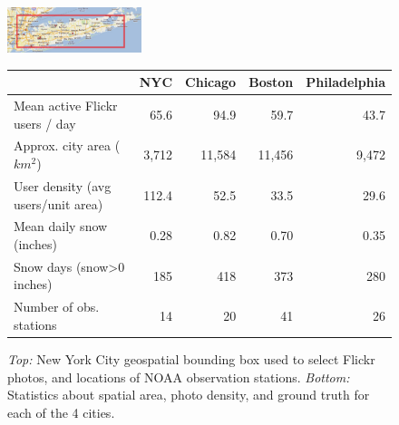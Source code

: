 

\begin{figure}
\begin{center}
\includegraphics[width=0.35\textwidth]{plots/nyc_stations.png} 
\end{center}
%
%
%
\begin{center}
{\small{
\newcommand{\spc}{\hspace{2pt}}
\begin{tabular} {|@{\spc}l@{\spc}|@{\spc}r@{\spc}|@{\spc}r@{\spc}|@{\spc}r@{\spc}|@{\spc}r@{\spc}|} 
\hline 
\textbf{} &{NYC}  &{Chicago} &{Boston}&{Philadelphia} \tabularnewline
\hline 
{Mean active Flickr users / day} &{65.6} &{94.9} &{59.7} &{43.7} \tabularnewline
\hline 
{Approx. city area ($km^2$)} &{3,712} &{11,584} &{11,456} &{9,472}  \tabularnewline
\hline 
{User density (avg users/unit area)} &{112.4} &{52.5} &{33.5} &{29.6} \tabularnewline
\hline 
{Mean daily snow (inches)} &{0.28} &{0.82} &{0.70} &{0.35} \tabularnewline
\hline 
{Snow days (snow>0 inches)} &{185} &{418} &{373} &{280} \tabularnewline
\hline 
{Number of obs. stations} &{14} &{20} &{41} &{26} \tabularnewline
\hline 
\end{tabular}}}
\end{center}
\vspace{-12pt}
 \caption {\textit{Top:} New York City geospatial bounding box used to select Flickr photos, and locations of NOAA observation stations. \textit{Bottom:} Statistics about spatial area, photo density, and ground truth for each of the 4 cities.}
\label{tab:city_statistics} 
\end{figure}

